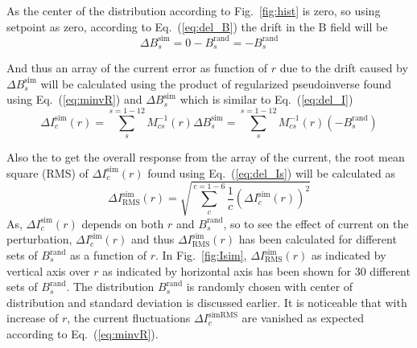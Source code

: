 \FloatBarrier
As the center of the distribution according to Fig.~\ref{fig:hist} is zero, so using setpoint as zero, according to Eq.~(\ref{eq:del_B}) the drift in the B field will be  
\begin{equation}\label{eq:del_Bs}
    \Delta B_s^{\text{sim}} = 0 - B_s^{\text{rand}}=-B_s^{\text{rand}}
\end{equation}

And thus an array of the current error  as function of $r$ due to the drift caused by $\Delta B_s^{\text{sim}}$ will be calculated using the product of regularized pseudoinverse found using Eq.~(\ref{eq:minvR}) and $\Delta B_s^{\text{sim}}$ which is similar to Eq.~(\ref{eq:del_I})
\begin{equation}\label{eq:del_Is}
    \Delta I_c^{\text{sim}}(r) =\sum_s^{s=1-12} M^{-1}_{cs}(r) \Delta B_s^{\text{sim}}=\sum_s^{s=1-12} M^{-1}_{cs}(r) (-B_s^{\text{rand}})
\end{equation}

Also the to get the overall response from the array of the current, the root mean square (RMS) of $\Delta I_c^{\text{sim}}(r)$ found using Eq.~(\ref{eq:del_Is}) will be calculated as
\begin{equation}\label{eq:delta_Isim_rms}
     \Delta I_{\text{RMS}}^{\text{sim}}(r)= \sqrt{\sum_c^{c=1-6} \frac{1}{c}(\Delta I_c^{\text{sim}}(r))^2}
\end{equation}
As, $\Delta I_c^{\text{sim}}(r)$ depends on both $r$ and $B_s^{\text{rand}}$, so to see the effect of current on the perturbation, $\Delta I_c^{\text{sim}}(r)$ and thus $ \Delta I_{\text{RMS}}^{\text{sim}}(r)$  has been calculated for different sets of $B_s^{\text{rand}}$ as a function of $r$. In Fig.~\ref{fig:Isim}, $ \Delta I_{\text{RMS}}^{\text{sim}}(r)$ as indicated by vertical axis over $r$ as indicated by horizontal axis has been shown for 30 different sets of $B_s^{\text{rand}}$. The distribution $B_s^{\text{rand}}$ is randomly chosen with center of distribution and standard deviation is discussed earlier. It is noticeable that with increase of $r$, the current fluctuations $\Delta I_c^{\text{simRMS}}$ are vanished as expected according to Eq.~(\ref{eq:minvR}).


